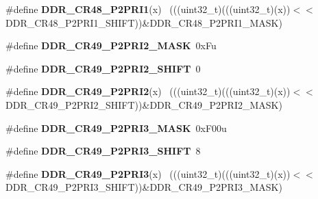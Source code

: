\begin{DoxyCompactItemize}
\item 
\hypertarget{group___d_d_r___register___masks_gae135cadecdab457e6a107692ec43231b}{}\#define {\bfseries D\+D\+R\+\_\+\+C\+R48\+\_\+\+P2\+P\+R\+I1}(x)                                          ~(((uint32\+\_\+t)(((uint32\+\_\+t)(x))$<$$<$D\+D\+R\+\_\+\+C\+R48\+\_\+\+P2\+P\+R\+I1\+\_\+\+S\+H\+I\+F\+T))\&D\+D\+R\+\_\+\+C\+R48\+\_\+\+P2\+P\+R\+I1\+\_\+\+M\+A\+S\+K)\label{group___d_d_r___register___masks_gae135cadecdab457e6a107692ec43231b}

\item 
\hypertarget{group___d_d_r___register___masks_gafc05dabaa62228e44b308cb7bf4d14e5}{}\#define {\bfseries D\+D\+R\+\_\+\+C\+R49\+\_\+\+P2\+P\+R\+I2\+\_\+\+M\+A\+S\+K}~0x\+Fu\label{group___d_d_r___register___masks_gafc05dabaa62228e44b308cb7bf4d14e5}

\item 
\hypertarget{group___d_d_r___register___masks_ga67c782180156959422958f39b36dad0a}{}\#define {\bfseries D\+D\+R\+\_\+\+C\+R49\+\_\+\+P2\+P\+R\+I2\+\_\+\+S\+H\+I\+F\+T}~0\label{group___d_d_r___register___masks_ga67c782180156959422958f39b36dad0a}

\item 
\hypertarget{group___d_d_r___register___masks_gacfe3267db00c9e2d9d3d4048fd307ce7}{}\#define {\bfseries D\+D\+R\+\_\+\+C\+R49\+\_\+\+P2\+P\+R\+I2}(x)                                          ~(((uint32\+\_\+t)(((uint32\+\_\+t)(x))$<$$<$D\+D\+R\+\_\+\+C\+R49\+\_\+\+P2\+P\+R\+I2\+\_\+\+S\+H\+I\+F\+T))\&D\+D\+R\+\_\+\+C\+R49\+\_\+\+P2\+P\+R\+I2\+\_\+\+M\+A\+S\+K)\label{group___d_d_r___register___masks_gacfe3267db00c9e2d9d3d4048fd307ce7}

\item 
\hypertarget{group___d_d_r___register___masks_gae22490a4f0a63d367b526e9b64d36942}{}\#define {\bfseries D\+D\+R\+\_\+\+C\+R49\+\_\+\+P2\+P\+R\+I3\+\_\+\+M\+A\+S\+K}~0x\+F00u\label{group___d_d_r___register___masks_gae22490a4f0a63d367b526e9b64d36942}

\item 
\hypertarget{group___d_d_r___register___masks_gaf4341302251bb3aac0e50f05601ee837}{}\#define {\bfseries D\+D\+R\+\_\+\+C\+R49\+\_\+\+P2\+P\+R\+I3\+\_\+\+S\+H\+I\+F\+T}~8\label{group___d_d_r___register___masks_gaf4341302251bb3aac0e50f05601ee837}

\item 
\hypertarget{group___d_d_r___register___masks_gabc2f1ca904e4f62f2a5f888c58d7669f}{}\#define {\bfseries D\+D\+R\+\_\+\+C\+R49\+\_\+\+P2\+P\+R\+I3}(x)                                          ~(((uint32\+\_\+t)(((uint32\+\_\+t)(x))$<$$<$D\+D\+R\+\_\+\+C\+R49\+\_\+\+P2\+P\+R\+I3\+\_\+\+S\+H\+I\+F\+T))\&D\+D\+R\+\_\+\+C\+R49\+\_\+\+P2\+P\+R\+I3\+\_\+\+M\+A\+S\+K)\label{group___d_d_r___register___masks_gabc2f1ca904e4f62f2a5f888c58d7669f}


\end{DoxyCompactItemize}

